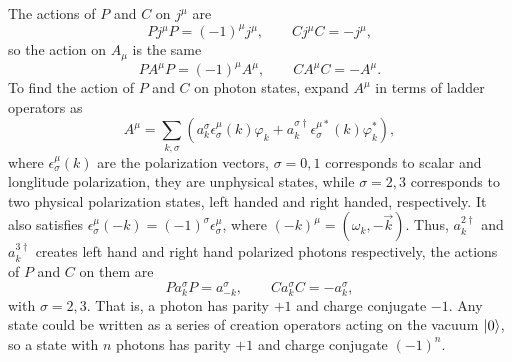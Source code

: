 \begin{problembody}
    \item The actions of $P$ and $C$ on $j^\mu$ are
    \begin{equation*}
        Pj^\mu P = (-1)^\mu j^\mu, \qquad Cj^\mu C = -j^\mu,
    \end{equation*}
    so the action on $A_\mu$ is the same
    \begin{equation*}
        PA^\mu P = (-1)^\mu A^\mu, \qquad CA^\mu C = -A^\mu.
    \end{equation*}
    To find the action of $P$ and $C$ on photon states, expand $A^\mu$ in terms of ladder operators as
    \begin{equation*}
        A^\mu = \sum_{k, \sigma} \left(
            a_k^\sigma\epsilon_\sigma^\mu(k)\varphi_k
            + a_k^{\sigma\dagger}\epsilon_\sigma^{\mu\ast}(k)\varphi_k^\ast
        \right),
    \end{equation*}
    where $\epsilon_\sigma^\mu(k)$ are the polarization vectors, $\sigma = 0, 1$ corresponds to scalar 
    and longlitude polarization, they are unphysical states, while $\sigma = 2, 3$ corresponds to 
    two physical polarization states, left handed and right handed, respectively. It also satisfies 
    $\epsilon_\sigma^\mu(-k) = (-1)^\sigma\epsilon_\sigma^\mu$, where $(-k)^\mu = (\omega_k, -\vec{k})$.
    Thus, $a_k^{2\dagger}$ and $a_k^{3\dagger}$ creates left hand and right hand polarized photons 
    respectively, the actions of $P$ and $C$ on them are
    \begin{equation*}
        P a_k^\sigma P = a_{-k}^\sigma, \qquad C a_k^\sigma C = -a_k^\sigma,
    \end{equation*}
    with $\sigma = 2, 3$. That is, a photon has parity $+1$ and charge conjugate $-1$. Any state could be 
    written as a series of creation operators acting on the vacuum $\left|0\right\rangle$, so a state with $n$ photons has
    parity $+1$ and charge conjugate $(-1)^n$. 
    

\end{problembody}
